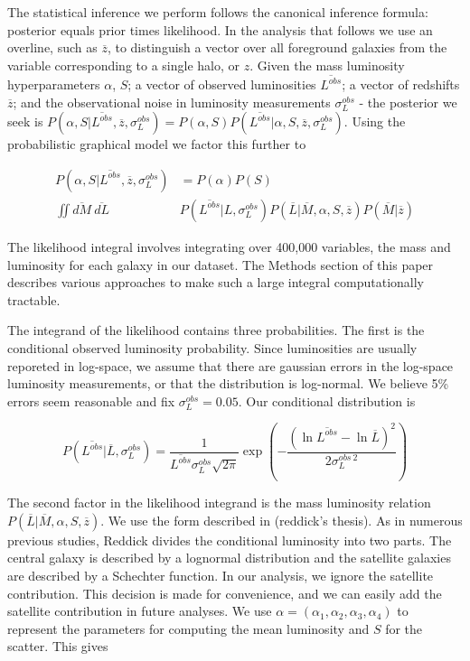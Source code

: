\documentclass[\docopts]{\docclass}
\begin{document}
The statistical inference we perform follows the canonical inference formula: posterior equals prior times likelihood. 
In the analysis that follows we use an overline, such as $\overline{z}$, to distinguish a vector over all foreground galaxies from the variable corresponding to a single halo, or $z$.
Given the mass luminosity hyperparameters $\alpha$, $S$; a vector of observed luminosities $\overline{L^{obs}}$; a vector of redshifts $\overline{z}$; and the observational noise in luminosity measurements $\sigma_L^{obs}$ - the posterior we seek is $P(\alpha, S| \overline{L^{obs}}, \overline{z}, \sigma_L^{obs}) = P(\alpha, S)P(\overline{L^{obs}}| \alpha, S, \overline{z}, \sigma_L^{obs})$. 
Using the probabilistic graphical model we factor this further to

\begin{align*}P(\alpha, S| \overline{L^{obs}}, \overline{z}, \sigma_L^{obs}) &= P(\alpha)P(S) \\
 \iint \overline{dM}\ \overline{dL}\ &P(\overline{L^{obs}}| L, \sigma_L^{obs}) P(\overline{L}|\overline{M},\alpha,S,\overline{z})P(\overline{M}|\overline{z})
\end{align*}

The likelihood integral involves integrating over 400,000 variables, the mass and luminosity for each galaxy in our dataset. 
The Methods section of this paper describes various approaches to make such a large integral computationally tractable. 

The integrand of the likelihood contains three probabilities. 
The first is the conditional observed luminosity probability. 
Since luminosities are usually reporeted in log-space, we assume that there are gaussian errors in the log-space luminosity measurements, or that the distribution is log-normal. 
We believe 5\% errors seem reasonable and fix $\sigma_L^{obs} = 0.05$. Our conditional distribution is 

$$P(\overline{L^{obs}}| \overline{L}, \sigma_L^{obs}) = \frac{1}{\overline{L^{obs}}\sigma_L^{obs}\sqrt{2\pi}}\exp\left(-\frac{(\ln \overline{L^{obs}} - \ln \overline{L})^2}{2\sigma_L^{obs\ 2}}\right)$$

The second factor in the likelihood integrand is the mass luminosity relation $P(\overline{L}|\overline{M},\alpha,S,\overline{z})$. 
We use the form described in (reddick's thesis). 
As in numerous previous studies, Reddick divides the conditional luminosity into two parts. 
The central galaxy is described by a lognormal distribution and the satellite galaxies are described by a Schechter function. 
In our analysis, we ignore the satellite contribution. 
This decision is made for convenience, and we can easily add the satellite contribution in future analyses. 
We use $\alpha = (\alpha_1, \alpha_2, \alpha_3, \alpha_4)$ to represent the parameters for computing the mean luminosity and $S$ for the scatter. 
This gives
\end{document}
